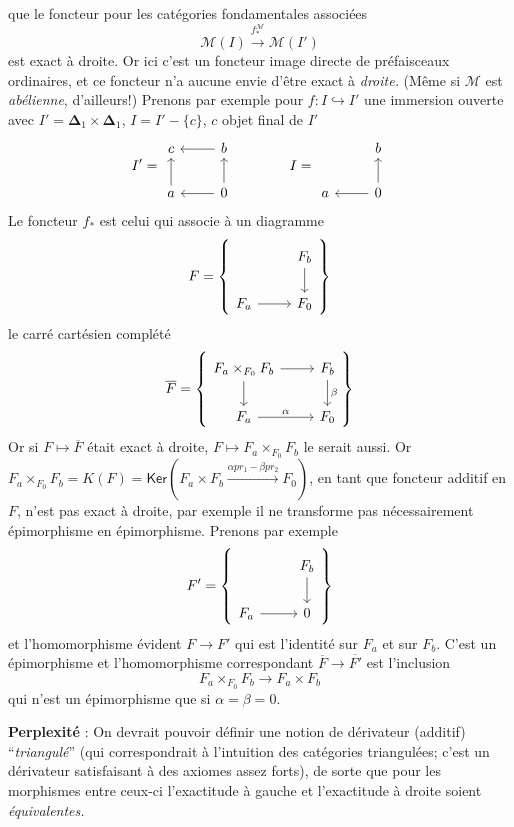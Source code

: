 \documentclass[11pt]{article}
\newcommand{\printedpage}[1]{\marginpar{\footnotesize p.~#1}}
\newcommand{\msp}[1]{\marginpar{\footnotesize [#1]}}
\begin{document}
\printedpage{19}
\msp{page 28}
que le foncteur pour les catégories fondamentales associées
\[ \mathcal{M}(I) \xrightarrow{f^{\mathcal{M}}_*} \mathcal{M}(I') \]
est exact à droite. Or ici c'est un foncteur image directe de préfaisceaux ordinaires, et ce foncteur n'a aucune envie d'être exact à \textit{droite.} (Même si $\mathcal{M}$ est \textit{abélienne}, d'ailleurs!) Prenons par exemple pour $f : I \hookrightarrow I'$ une immersion ouverte avec $I' = \boldsymbol{\Delta}_1 \times \boldsymbol{\Delta}_1$, $I = I' - \{c\}$, $c$ objet final de $I'$
\[
I' = \begin{tikzcd}
c & b \arrow[l] \\
a \arrow[u] & 0 \arrow[l] \arrow[u]
\end{tikzcd}
\qquad\qquad
I = \begin{tikzcd}
 & b \\
a & 0 \arrow[l] \arrow[u]
\end{tikzcd}
\]
Le foncteur $f_*$ est celui qui associe à un diagramme
\[
F = \left\{
\begin{tikzcd}
 & F_b \arrow[d] \\
F_a \arrow[r] & F_0
\end{tikzcd}
\right\}
\]
le carré cartésien complété
\[
\overline{F} = \left\{
\begin{tikzcd}
F_a \times_{F_0} F_b \arrow[r] \arrow[d] & F_b \arrow[d, "\beta"] \\
F_a \arrow[r, "\alpha"] & F_0
\end{tikzcd}
\right\}
\]
Or si $F \mapsto \overline{F}$ était exact à droite, $F \mapsto F_a \times_{F_0} F_b$ le serait aussi. Or $F_a \times_{F_0} F_b = K(F) = \mathsf{Ker}(F_a \times F_b \xrightarrow{\alpha pr_1 - \beta pr_2} F_0)$, en tant que foncteur additif en $F$, n'est pas exact à droite, par exemple il ne transforme pas nécessairement épimorphisme en épimorphisme. Prenons par exemple
\[
F' = \left\{
\begin{tikzcd}
 & F_b \arrow[d] \\
F_a \arrow[r] & 0
\end{tikzcd}
\right\}
\]
et l'homomorphisme évident $F \to F'$ qui est l'identité sur
\msp{page 29}
$F_a$ et sur $F_b$. C'est un épimorphisme et l'homomorphisme correspondant $\overline{F} \to \overline{F'}$ est l'inclusion
\[ F_a \times_{F_0} F_b \longrightarrow F_a \times F_b \]
qui n'est un épimorphisme que si $\alpha = \beta = 0$.

\printedpage{20}
\textbf{Perplexité} : On devrait pouvoir définir une notion de dérivateur (additif) “\textit{triangulé}” (qui correspondrait à l'intuition des catégories triangulées; c'est un dérivateur satisfaisant à des axiomes assez forts), de sorte que pour les morphismes entre ceux-ci l'exactitude à gauche et l'exactitude à droite soient \textit{équivalentes.}
\end{document}

